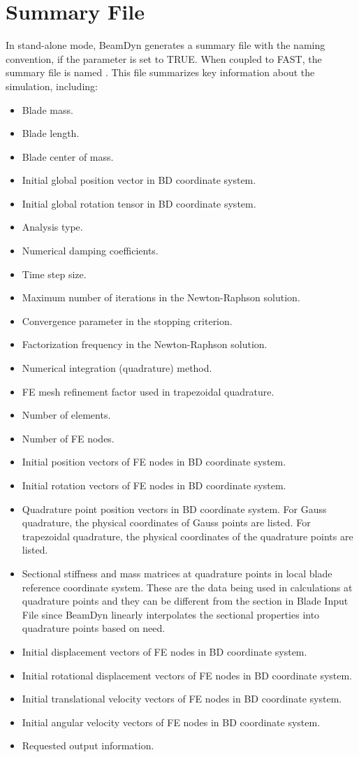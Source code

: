 \section{Summary File}
\label{sec:SumFile}
In stand-alone mode, BeamDyn generates a summary file with the naming convention,   if the   parameter is set to TRUE. When coupled to FAST, the summary file is named . 
This file summarizes key information about the simulation, including:
\begin{itemize}
  \item Blade mass.
  \item Blade length.
  \item Blade center of mass.
  \item Initial global position vector in BD coordinate system.
  \item Initial global rotation tensor in BD coordinate system.
  \item Analysis type.
  \item Numerical damping coefficients.
  \item Time step size.
  \item Maximum number of iterations in the Newton-Raphson solution.
  \item Convergence parameter in the stopping criterion.
  \item Factorization frequency in the Newton-Raphson solution.
  \item Numerical integration (quadrature) method.
  \item FE mesh refinement factor used in trapezoidal quadrature.
  \item Number of elements.
  \item Number of FE nodes.
  \item Initial position vectors of FE nodes in BD coordinate system.
  \item Initial rotation vectors of FE nodes in BD coordinate system.
  \item Quadrature point position vectors in BD coordinate system. For Gauss quadrature, the physical coordinates of Gauss points are listed. For trapezoidal quadrature, the physical coordinates of the quadrature points are listed.
  \item Sectional stiffness and mass matrices at quadrature points in local blade reference coordinate system. These are the data being used in calculations at quadrature points and they can be different from the section in Blade Input File since BeamDyn linearly interpolates the sectional properties into quadrature points based on need.
  \item Initial displacement vectors of FE nodes in BD coordinate system.
  \item Initial rotational displacement vectors of FE nodes in BD coordinate system.
  \item Initial translational velocity vectors of FE nodes in BD coordinate system.
  \item Initial angular velocity vectors of FE nodes in BD coordinate system.
  \item Requested output information.
\end{itemize}
